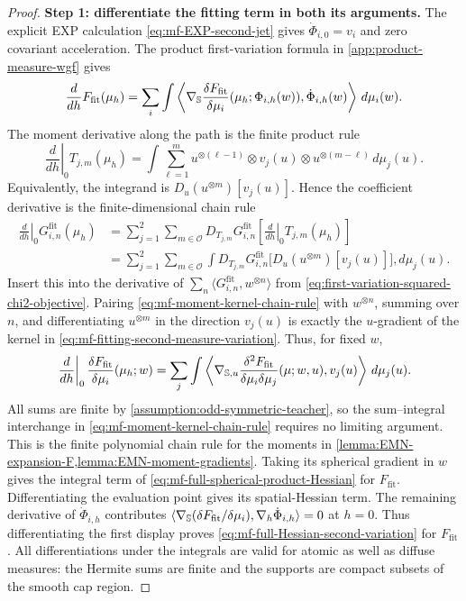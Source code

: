 \begin{proof}
\noindent\textbf{Step 1: differentiate the fitting term in both its arguments.}
The explicit EXP calculation \eqref{eq:mf-EXP-second-jet} gives
$\dot\Phi_{i,0}=v_i$ and zero covariant acceleration.
The product first-variation formula in \cref{app:product-measure-wgf} gives
\[
 \frac d{dh}F_{\mathrm{fit}}(\mu_h)
 =\sum_i\int\left\langle
   \nabla_{\mathbb{S}}\frac{\delta F_{\mathrm{fit}}}{\delta\mu_i}
                   (\mu_h;\Phi_{i,h}(w)),\dot\Phi_{i,h}(w)
                 \right\rangle\,d\mu_i(w).
\]
The moment derivative along the path is the finite product rule
\[
 \left.\frac d{dh}\right|_0T_{j,m}(\mu_h)
 =\int\sum_{\ell=1}^m
 u^{\otimes(\ell-1)}\otimes v_j(u)\otimes u^{\otimes(m-\ell)}
 \,d\mu_j(u).
\]
Equivalently, the integrand is
\(D_u(u^{\otimes m})[v_j(u)]\).  Hence the coefficient derivative is
the finite-dimensional chain rule
\begin{equation}
\label{eq:mf-moment-kernel-chain-rule}
\begin{aligned}
 \left.\frac d{dh}\right|_0G_{i,n}^{\mathrm{fit}}(\mu_h)
 &=\sum_{j=1}^2\sum_{m\in\mathcal O}
 D_{T_{j,m}}G_{i,n}^{\mathrm{fit}}
       \left[\left.\frac d{dh}\right|_0T_{j,m}(\mu_h)\right]\\
 &=\sum_{j=1}^2\sum_{m\in\mathcal O}\int
 D_{T_{j,m}}G_{i,n}^{\mathrm{fit}}
       \bigl[D_u(u^{\otimes m})[v_j(u)]\bigr],d\mu_j(u).
\end{aligned}
\end{equation}
Insert this into the derivative of
$\sum_n\langle G_{i,n}^{\mathrm{fit}},w^{\otimes n}\rangle$ from
\cref{eq:first-variation-squared-chi2-objective}.  Pairing
\cref{eq:mf-moment-kernel-chain-rule} with \(w^{\otimes n}\), summing over
\(n\), and differentiating \(u^{\otimes m}\) in the direction
\(v_j(u)\) is exactly the \(u\)-gradient of the kernel in
\cref{eq:mf-fitting-second-measure-variation}.  Thus, for fixed \(w\),
\[
 \left.\frac d{dh}\right|_0
       \frac{\delta F_{\mathrm{fit}}}{\delta\mu_i}(\mu_h;w)
 =\sum_j\int\left\langle
       \nabla_{\mathbb{S},u}
       \frac{\delta^2F_{\mathrm{fit}}}{\delta\mu_i\delta\mu_j}(\mu;w,u),
       v_j(u)\right\rangle\,d\mu_j(u).
\]
All sums are finite by \cref{assumption:odd-symmetric-teacher}, so the
sum--integral interchange in \cref{eq:mf-moment-kernel-chain-rule} requires
no limiting argument.  This is the finite polynomial chain rule for the
moments in \cref{lemma:EMN-expansion-F,lemma:EMN-moment-gradients}.
Taking its spherical gradient in $w$ gives the integral term of
\eqref{eq:mf-full-spherical-product-Hessian} for $F_{\mathrm{fit}}$.
Differentiating the evaluation point gives its spatial-Hessian term.
The remaining derivative of $\dot\Phi_{i,h}$ contributes
$\langle\nabla_{\mathbb{S}}(\delta F_{\mathrm{fit}}/\delta\mu_i),
        \nabla_h\dot\Phi_{i,h}\rangle=0$ at $h=0$.
Thus differentiating the first display proves
\eqref{eq:mf-full-Hessian-second-variation} for $F_{\mathrm{fit}}$.
All differentiations under the integrals are valid for atomic as well
as diffuse measures: the Hermite sums are finite and the supports are
compact subsets of the smooth cap region.


\end{proof}
